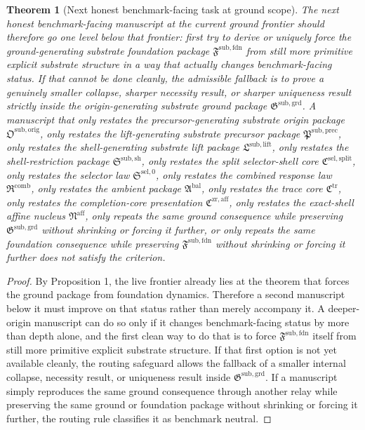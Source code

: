 \documentclass[11pt]{article}
\newcommand{\CompletionCore}{\mathfrak C^{\mathrm{zr,aff}}}
\newcommand{\TraceCore}{\mathfrak C^{\mathrm{tr}}}
\newcommand{\AffineNucleus}{\mathfrak N^{\mathrm{aff}}}
\newcommand{\AmbientPackage}{\mathfrak A^{\mathrm{bal}}}
\newcommand{\CombinedLaw}{\mathfrak R^{\mathrm{comb}}}
\newcommand{\SelectorLaw}{\mathfrak S^{\mathrm{sel},0}}
\newcommand{\SelectorCore}{\mathfrak C^{\mathrm{sel,split}}}
\newcommand{\ShellRestriction}{\mathfrak S^{\mathrm{sub,sh}}}
\newcommand{\LiftPackage}{\mathfrak L^{\mathrm{sub,lift}}}
\newcommand{\PrecursorPackage}{\mathfrak P^{\mathrm{sub,prec}}}
\newcommand{\OriginPackage}{\mathfrak O^{\mathrm{sub,orig}}}
\newcommand{\GroundPackage}{\mathfrak G^{\mathrm{sub,grd}}}
\newcommand{\FoundationPackage}{\mathfrak F^{\mathrm{sub,fdn}}}
\newtheorem{theorem}{Theorem}
\begin{document}
\begin{theorem}[Next honest benchmark-facing task at ground scope]
The next honest benchmark-facing manuscript at the current ground frontier should therefore go one level below that frontier: first try to derive or uniquely force the ground-generating substrate foundation package \(\FoundationPackage\) from still more primitive explicit substrate structure in a way that actually changes benchmark-facing status. If that cannot be done cleanly, the admissible fallback is to prove a genuinely smaller collapse, sharper necessity result, or sharper uniqueness result strictly inside the origin-generating substrate ground package \(\GroundPackage\). A manuscript that only restates the precursor-generating substrate origin package \(\OriginPackage\), only restates the lift-generating substrate precursor package \(\PrecursorPackage\), only restates the shell-generating substrate lift package \(\LiftPackage\), only restates the shell-restriction package \(\ShellRestriction\), only restates the split selector-shell core \(\SelectorCore\), only restates the selector law \(\SelectorLaw\), only restates the combined response law \(\CombinedLaw\), only restates the ambient package \(\AmbientPackage\), only restates the trace core \(\TraceCore\), only restates the completion-core presentation \(\CompletionCore\), only restates the exact-shell affine nucleus \(\AffineNucleus\), only repeats the same ground consequence while preserving \(\GroundPackage\) without shrinking or forcing it further, or only repeats the same foundation consequence while preserving \(\FoundationPackage\) without shrinking or forcing it further does not satisfy the criterion.
\end{theorem}

\begin{proof}
By Proposition 1, the live frontier already lies at the theorem that forces the ground package from foundation dynamics. Therefore a second manuscript below it must improve on that status rather than merely accompany it. A deeper-origin manuscript can do so only if it changes benchmark-facing status by more than depth alone, and the first clean way to do that is to force \(\FoundationPackage\) itself from still more primitive explicit substrate structure. If that first option is not yet available cleanly, the routing safeguard allows the fallback of a smaller internal collapse, necessity result, or uniqueness result inside \(\GroundPackage\). If a manuscript simply reproduces the same ground consequence through another relay while preserving the same ground or foundation package without shrinking or forcing it further, the routing rule classifies it as benchmark neutral.
\end{proof}
\end{document}
